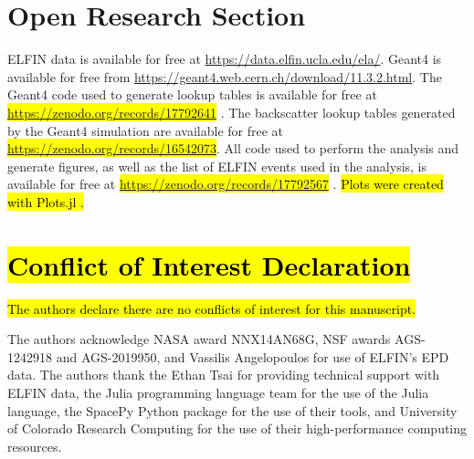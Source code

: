\documentclass[draft]{agujournal2019}
\begin{document}
\section*{Open Research Section}
ELFIN data \hl{\mbox{\cite{angelopoulos2020}}} is available for free at \url{https://data.elfin.ucla.edu/ela/}. Geant4 \hl{\mbox{\cite{agostinelli2003}}} is available for free from \url{https://geant4.web.cern.ch/download/11.3.2.html}. The Geant4 code used to generate lookup tables is available for free at \hl{\mbox{\url{https://zenodo.org/records/17792641}}} \hl{\mbox{\cite{claxton2025-g4epp}}}. The backscatter lookup tables generated by the Geant4 simulation are available for free at \hl{\mbox{\url{https://zenodo.org/records/16542073}}}. All code used to perform the analysis and generate figures, as well as the list of ELFIN events used in the analysis, is available for free at \hl{\mbox{\url{https://zenodo.org/records/17792567}}} \hl{\mbox{\cite{claxton2025-backscatter-code}}}. \hl{Plots were created with Plots.jl \mbox{\cite{julia-plots}}.}

\section*{\hl{Conflict of Interest Declaration}}
\hl{The authors declare there are no conflicts of interest for this manuscript.}

\acknowledgments
The authors acknowledge NASA award NNX14AN68G, NSF awards AGS-1242918 and AGS-2019950, and Vassilis Angelopoulos for use of ELFIN's EPD data. The authors thank the Ethan Tsai for providing technical support with ELFIN data, the Julia programming language team \cite{julia-language} for the use of the Julia language, the SpacePy Python package \cite{spacepy2, spacepy1} for the use of their tools, and University of Colorado Research Computing for the use of their high-performance computing resources.

%

%
\end{document}
